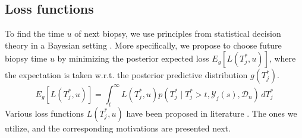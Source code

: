 \subsection{Loss functions}
\label{subsec : loss_functions}
To find the time $u$ of next biopsy, we use principles from statistical decision theory in a Bayesian setting \citep{bergerDecisionTheory,robertBayesianChoice}. More specifically, we propose to choose future biopsy time $u$ by minimizing the posterior expected loss $E_g[L(T^*_j, u)]$, where the expectation is taken w.r.t. the posterior predictive distribution $g(T^*_j)$. 
\begin{equation*}
E_g[L(T^*_j, u)] = \int_t^\infty L(T^*_j, u) p(T^*_j \mid T^*_j > t, \mathcal{Y}_j(s), \mathcal{D}_n) \,dT^*_j
\end{equation*}
Various loss functions $L(T^*_j, u)$ have been proposed in literature \citep{robertBayesianChoice}. The ones we utilize, and the corresponding motivations are presented next.

